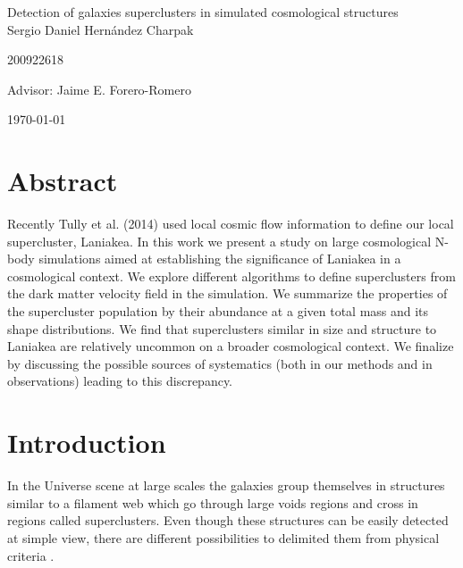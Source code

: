 \documentclass[12pt]{article}
\begin{document}
\begin{center}
\Huge
Detection of galaxies superclusters in simulated cosmological structures\\  
\vspace{3mm}
\Large Sergio Daniel Hern\'{a}ndez Charpak

\large
200922618

\vspace{2mm}
\Large
Advisor: Jaime E. Forero-Romero

\normalsize
\vspace{2mm}

\today
\end{center}


\normalsize
\tableofcontents
\newpage

\section{Abstract}
Recently Tully et al. (2014) \cite{tully_laniakea_2014} used local cosmic flow information to
define our local supercluster, Laniakea. 
In this work we present a study on large cosmological N-body
simulations aimed at establishing the significance of Laniakea in a
cosmological context.
We explore different algorithms to define superclusters from the dark
matter velocity field in the simulation. 
We summarize the properties of the supercluster population by their
abundance at a given total mass and its shape distributions.
We find that superclusters similar in size and structure to Laniakea are
relatively uncommon on a broader cosmological context.
We finalize by discussing the possible sources of systematics (both in
our methods and in observations) leading to this discrepancy.

\section{Introduction}

In the Universe scene at large scales the galaxies group themselves in structures
similar to a filament web which go through large voids regions and cross in regions
called superclusters. Even though these structures can be easily detected at simple
view, there are different possibilities to delimited them from physical criteria \cite{gott_iii_map_2005}.    
\\
\end{document}
